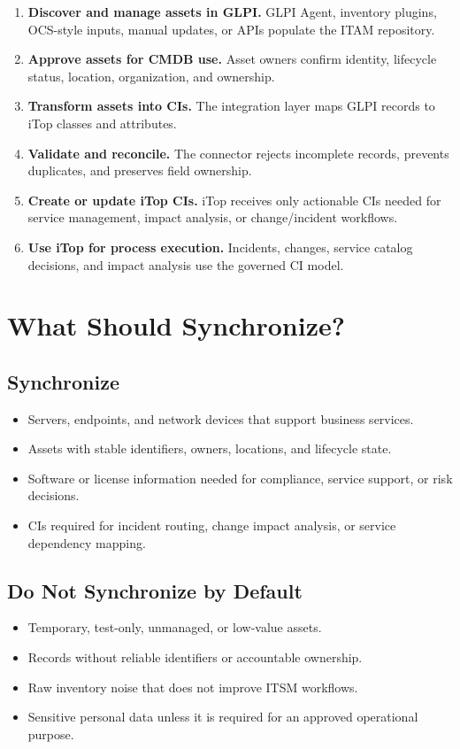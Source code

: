 \documentclass[11pt]{article}
\begin{document}
\begin{enumerate}
  \item \textbf{Discover and manage assets in GLPI.} GLPI Agent, inventory plugins, OCS-style inputs, manual updates, or APIs populate the ITAM repository.
  \item \textbf{Approve assets for CMDB use.} Asset owners confirm identity, lifecycle status, location, organization, and ownership.
  \item \textbf{Transform assets into CIs.} The integration layer maps GLPI records to iTop classes and attributes.
  \item \textbf{Validate and reconcile.} The connector rejects incomplete records, prevents duplicates, and preserves field ownership.
  \item \textbf{Create or update iTop CIs.} iTop receives only actionable CIs needed for service management, impact analysis, or change/incident workflows.
  \item \textbf{Use iTop for process execution.} Incidents, changes, service catalog decisions, and impact analysis use the governed CI model.
\end{enumerate}

\section{What Should Synchronize?}

\subsection{Synchronize}
\begin{itemize}
  \item Servers, endpoints, and network devices that support business services.
  \item Assets with stable identifiers, owners, locations, and lifecycle state.
  \item Software or license information needed for compliance, service support, or risk decisions.
  \item CIs required for incident routing, change impact analysis, or service dependency mapping.
\end{itemize}

\subsection{Do Not Synchronize by Default}
\begin{itemize}
  \item Temporary, test-only, unmanaged, or low-value assets.
  \item Records without reliable identifiers or accountable ownership.
  \item Raw inventory noise that does not improve ITSM workflows.
  \item Sensitive personal data unless it is required for an approved operational purpose.
\end{itemize}
\end{document}
